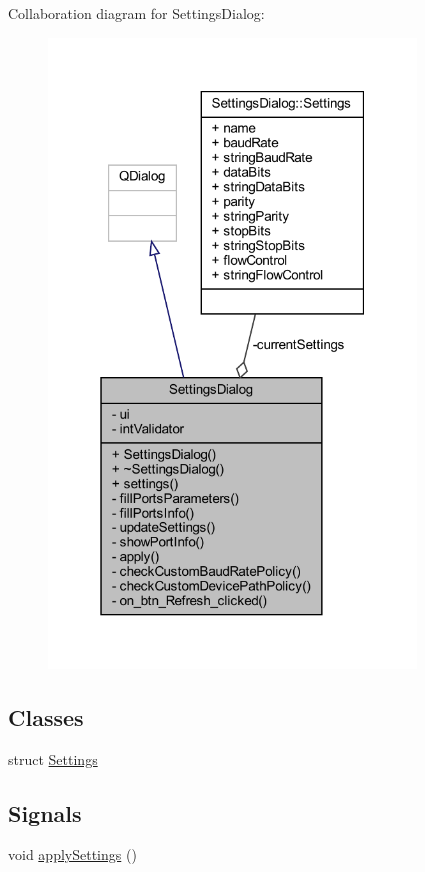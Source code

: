 Collaboration diagram for Settings\+Dialog\+:
\nopagebreak
\begin{figure}[H]
\begin{center}
\leavevmode
\includegraphics[width=277pt]{class_settings_dialog__coll__graph}
\end{center}
\end{figure}
\subsection*{Classes}
\begin{DoxyCompactItemize}
\item 
struct \mbox{\hyperlink{struct_settings_dialog_1_1_settings}{Settings}}
\end{DoxyCompactItemize}
\subsection*{Signals}
\begin{DoxyCompactItemize}
\item 
void \mbox{\hyperlink{class_settings_dialog_a20ba98dff60a58a8dd732eb4d061ea3f}{apply\+Settings}} ()
\end{DoxyCompactItemize}
